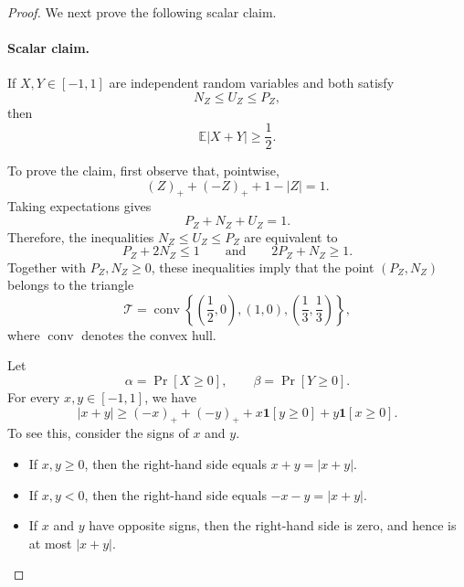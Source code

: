\documentclass[11pt]{article}
\newcommand{\ind}{\mathbf{1}}
\begin{document}
\begin{proof}
We next prove the following scalar claim.

\paragraph{Scalar claim.}
If $X,Y\in[-1,1]$ are independent random variables and both satisfy
\[
    N_Z\le U_Z\le P_Z,
\]
then
\begin{equation}
    \mathbb E|X+Y|\ge\frac12.
    \label{eq:scalar-claim}
\end{equation}

To prove the claim, first observe that, pointwise,
\[
    (Z)_++(-Z)_++1-|Z|=1.
\]
Taking expectations gives
\begin{equation}
    P_Z+N_Z+U_Z=1.
    \label{eq:PNU-sum}
\end{equation}
Therefore, the inequalities $N_Z\le U_Z\le P_Z$ are equivalent to
\[
    P_Z+2N_Z\le1
    \qquad\text{and}\qquad
    2P_Z+N_Z\ge1.
\]
Together with $P_Z,N_Z\ge0$, these inequalities imply that the point
$(P_Z,N_Z)$ belongs to the triangle
\[
    \mathcal T
    =
    \operatorname{conv}
    \left\{
        \left(\frac12,0\right),
        (1,0),
        \left(\frac13,\frac13\right)
    \right\},
\]
where $\operatorname{conv}$ denotes the convex hull.

Let
\[
    \alpha=\Pr[X\ge0],
    \qquad
    \beta=\Pr[Y\ge0].
\]
For every $x,y\in[-1,1]$, we have
\begin{equation}
    |x+y|
    \ge
    (-x)_++(-y)_+
    +x\ind[y\ge0]
    +y\ind[x\ge0].
    \label{eq:pointwise-scalar}
\end{equation}
To see this, consider the signs of $x$ and $y$.

\begin{itemize}
    \item If $x,y\ge0$, then the right-hand side equals $x+y=|x+y|$.
    \item If $x,y<0$, then the right-hand side equals
          $-x-y=|x+y|$.
    \item If $x$ and $y$ have opposite signs, then the right-hand side is
          zero, and hence is at most $|x+y|$.
\end{itemize}


\end{proof}
\end{document}
